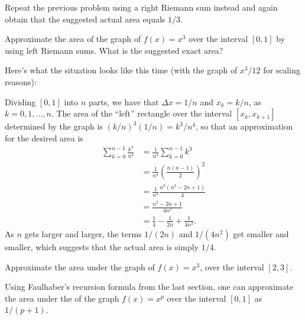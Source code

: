 \documentclass[nooutcomes]{ximera}
\begin{document}
\begin{exploration}
  Repeat the previous problem using a right Riemann sum instead and again obtain that the suggested actual area equals $1/3$.
\end{exploration}

\begin{example}
  Approximate the area of the graph of $f(x) = x^3$ over the interval $[0,1]$ by using left Riemann sums. What is the suggested exact area?

  \begin{explanation}
    Here's what the situation looks like this time (with the graph of $x^3/12$ for scaling reasons):

    \begin{image}
\end{image}

    Dividing $[0,1]$ into $n$ parts, we have that $\Delta x = 1/n$ and $x_k = k/n$, as $k=0,1,\ldots, n$. The area of the ``left'' rectangle over the interval $[x_k,x_{k+1}]$ determined by the graph is $(k/n)^3(1/n) = k^3/n^4$, so that an approximation for the desired area is
    \begin{align*}
      \sum_{k=0}^{n-1}\frac{k^3}{n^4} &= \frac{1}{n^4}\sum_{k=0}^{n-1} k^3 \\ &= \frac{1}{n^4} \left(\frac{n(n-1)}{2}\right)^2 \\ &= \frac{1}{n^4} \frac{n^2(n^2-2n+1)}{4} \\ &= \frac{n^2-2n+1}{4n^2} \\ &= \frac{1}{4} -\frac{1}{2n} + \frac{1}{4n^2}.
    \end{align*}
As $n$ gets larger and larger, the terms $1/(2n)$ and $1/(4n^2)$ get smaller and smaller, which suggests that the actual area is simply $1/4$.
  \end{explanation}
\end{example}

\begin{exploration}
  Approximate the area under the graph of $f(x)=x^3$, over the interval $[2,3]$.
\end{exploration}

Using Faulhaber's recursion formula from the last section, one can approximate the area under the of the graph $f(x) = x^p$ over the interval $[0,1]$ as $1/(p+1)$.
\end{document}
